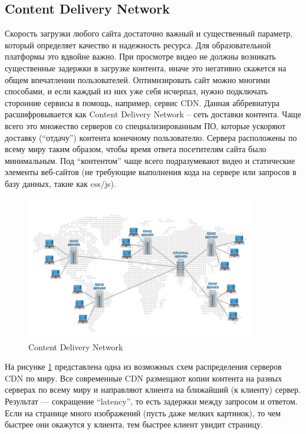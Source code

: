 \subsection{Content Delivery Network}

Скорость загрузки любого сайта достаточно важный и существенный параметр, который определяет
качество и надежность ресурса. Для образовательной платформы это вдвойне важно. При просмотре
видео не должны возникать существенные задержки в загрузке контента, иначе это негативно
скажется на общем впечатлении пользователей. Оптимизировать сайт можно многими способами,
и если каждый из них уже себя исчерпал, нужно подключать сторонние сервисы в помощь, например,
сервис CDN. Данная аббревиатура расшифровывается как Content Delivery Network – сеть доставки
контента. Чаще всего это множество серверов со специализированным ПО, которые ускоряют доставку
(“отдачу”) контента конечному пользователю. Сервера расположены по всему миру таким образом,
чтобы время ответа посетителям сайта было минимальным. Под “контентом” чаще всего
подразумевают видео и статические элементы веб-сайтов (не требующие выполнения кода на сервере
или запросов в базу данных, такие как css/js).

\begin{figure}
  \centering
  \includegraphics[width=0.9\textwidth]{images/how-cdn-works.png}
  \caption{Content Delivery Network\label{how-cdn-works}}
\end{figure}

На рисунке \ref{how-cdn-works} представлена одна из возможных схем распределения серверов CDN по миру.
Все современные CDN размещают копии контента на разных серверах по всему миру и направляют
клиента на ближайший (к клиенту) сервер. Результат — сокращение “latency”, то есть задержки
между запросом и ответом. Если на странице много изображений (пусть даже мелких картинок),
то чем быстрее они окажутся у клиента, тем быстрее клиент увидит страницу.

